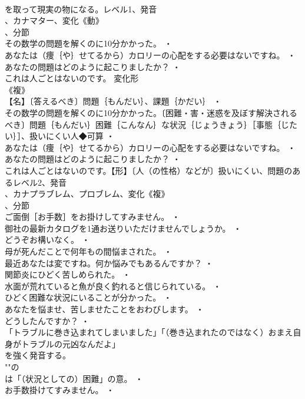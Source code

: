 \documentclass[8pt]{extreport}
\begin{document}
\begin{CJK}{UTF8}{min}
\\	を取って現実の物になる。レベル1、発音
\\	、カナマター、変化《動》
\\	、分節
\\	その数学の問題を解くのに10分かかった。 ・
\\	あなたは（痩｛や｝せてるから）カロリーの心配をする必要はないですね。 ・
\\	あなたの問題はどのように起こりましたか？ ・
\\	これは人ごとはないのです。	変化形 
\\	《複》
\\	【名】〔答えるべき〕問題｛もんだい｝、課題｛かだい｝ ・
\\	その数学の問題を解くのに10分かかった。〔困難・害・迷惑を及ぼす解決されるべき〕問題｛もんだい｝困難｛こんなん｝な状況｛じょうきょう｝［事態｛じたい｝］、扱いにくい人◆可算 ・
\\	あなたは（痩｛や｝せてるから）カロリーの心配をする必要はないですね。 ・
\\	あなたの問題はどのように起こりましたか？ ・
\\	これは人ごとはないのです。【形】〔人（の性格）などが〕扱いにくい、問題のあるレベル2、発音
\\	、カナプラブレム、プロブレム、変化《複》
\\	、分節
\\	ご面倒［お手数］をお掛けしてすみません。 ・
\\	御社の最新カタログを1通お送りいただけませんでしょうか。 ・
\\	どうぞお構いなく。 ・
\\	母が死んだことで何年もの間悩まされた。 ・
\\	最近あなたは変ですね。何か悩みでもあるんですか？ ・
\\	関節炎にひどく苦しめられた。 ・
\\	水面が荒れていると魚が良く釣れると信じられている。 ・
\\	ひどく困難な状況にいることが分かった。 ・
\\	あなたを悩ませ、苦しませたことをおわびします。 ・
\\	どうしたんですか？ ・
\\	「トラブルに巻き込まれてしまいました」「（巻き込まれたのではなく）おまえ自身がトラブルの元凶なんだよ」
\\	を強く発音する。
\\	""の
\\	は「（状況としての）困難」の意。 ・
\\	お手数掛けてすみません。 ・

\end{CJK}
\end{document}

